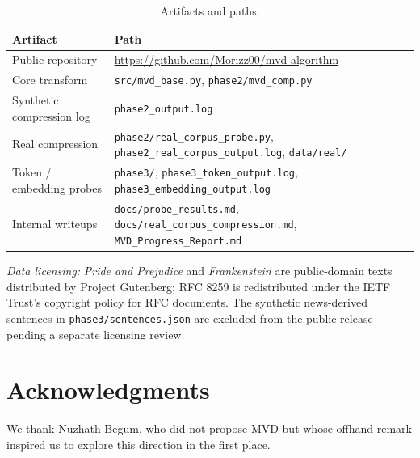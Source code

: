 \documentclass{article}
\begin{document}
\begin{table}[h]
	\caption{Artifacts and paths.}
	\centering
	\begin{tabular}{ll}
		\toprule
		Artifact                    & Path                                              \\
		\midrule
		Public repository           & \url{https://github.com/Morizz00/mvd-algorithm} \\
		Core transform              & \texttt{src/mvd\_base.py}, \texttt{phase2/mvd\_comp.py} \\
		Synthetic compression log   & \texttt{phase2\_output.log}                       \\
		Real compression            & \texttt{phase2/real\_corpus\_probe.py}, \texttt{phase2\_real\_corpus\_output.log}, \texttt{data/real/} \\
		Token / embedding probes    & \texttt{phase3/}, \texttt{phase3\_token\_output.log}, \texttt{phase3\_embedding\_output.log} \\
		Internal writeups           & \texttt{docs/probe\_results.md}, \texttt{docs/real\_corpus\_compression.md}, \texttt{MVD\_Progress\_Report.md} \\
		\bottomrule
	\end{tabular}
	\label{tab:repro}
\end{table}

\noindent\emph{Data licensing:} \emph{Pride and Prejudice} and \emph{Frankenstein} are public-domain texts distributed by Project Gutenberg; RFC 8259 is redistributed under the IETF Trust's copyright policy for RFC documents. The synthetic news-derived sentences in \texttt{phase3/sentences.json} are excluded from the public release pending a separate licensing review.

\section*{Acknowledgments}

We thank Nuzhath Begum, who did not propose MVD but whose offhand remark inspired us to explore this direction in the first place.



\end{document}
